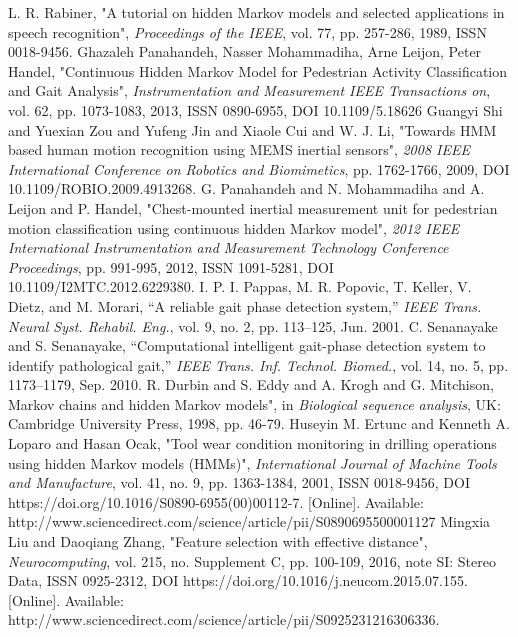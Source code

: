 

\begin{thebibliography}{5}
	
 L. R. Rabiner, "A tutorial on hidden Markov models and selected applications in speech recognition", \emph{Proceedings of the IEEE}, vol. 77, pp. 257-286, 1989, ISSN 0018-9456.
 Ghazaleh Panahandeh, Nasser Mohammadiha, Arne Leijon, Peter Handel, "Continuous Hidden Markov Model for Pedestrian Activity Classification and Gait Analysis", \emph{Instrumentation and Measurement IEEE Transactions on}, vol. 62, pp. 1073-1083, 2013, ISSN 0890-6955, DOI 10.1109/5.18626
 Guangyi Shi and Yuexian Zou and Yufeng Jin and Xiaole Cui and W. J. Li, "Towards HMM based human motion recognition using MEMS inertial sensors", \emph{2008 IEEE International Conference on Robotics and Biomimetics}, pp. 1762-1766, 2009, DOI 10.1109/ROBIO.2009.4913268.
 G. Panahandeh and N. Mohammadiha and A. Leijon and P. Handel, "Chest-mounted inertial measurement unit for pedestrian motion classification using continuous hidden Markov model", \emph{2012 IEEE International Instrumentation and Measurement Technology Conference Proceedings}, pp. 991-995, 2012, ISSN 1091-5281, DOI 10.1109/I2MTC.2012.6229380.
 I. P. I. Pappas, M. R. Popovic, T. Keller, V. Dietz, and M. Morari, “A
reliable gait phase detection system,” \emph{IEEE Trans. Neural Syst. Rehabil.
	Eng.}, vol. 9, no. 2, pp. 113–125, Jun. 2001.
 C. Senanayake and S. Senanayake, “Computational intelligent gait-phase
detection system to identify pathological gait,” \emph{IEEE Trans. Inf. Technol.
	Biomed.}, vol. 14, no. 5, pp. 1173–1179, Sep. 2010.
 R. Durbin and S. Eddy and A. Krogh and G. Mitchison, Markov chains and hidden Markov models", in \emph{Biological sequence analysis}, UK: Cambridge University Press, 1998, pp. 46-79.
 Huseyin M. Ertunc and Kenneth A. Loparo and Hasan Ocak, "Tool wear condition monitoring in drilling operations using hidden Markov models (HMMs)", \emph{International Journal of Machine Tools and Manufacture}, vol. 41, no. 9, pp. 1363-1384, 2001, ISSN 0018-9456, DOI https://doi.org/10.1016/S0890-6955(00)00112-7. [Online]. Available:  http://www.sciencedirect.com/science/article/pii/S0890695500001127
 Mingxia Liu and Daoqiang Zhang, "Feature selection with effective distance", \emph{Neurocomputing}, vol. 215, no. Supplement C, pp. 100-109, 2016, note SI: Stereo Data, ISSN 0925-2312, DOI https://doi.org/10.1016/j.neucom.2015.07.155. [Online]. Available: http://www.sciencedirect.com/science/article/pii/S0925231216306336. 

\end{thebibliography}
